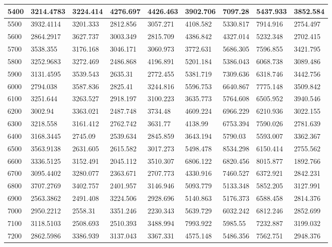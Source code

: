 \begin{table}[]
{\begin{tabular}{|l|l|l|l|l|l|l|l|l|}
5400 & 3214.4783 & 3224.414 & 4276.697 & 4426.463 & 3902.706 & 7097.28 & 5437.933 & 3852.584 \\ \hline
5500 & 3932.4114 & 3201.333 & 2812.856 & 3057.271 & 4108.582 & 5330.817 & 7914.916 & 2754.497 \\ \hline
5600 & 2864.2917 & 3627.737 & 3003.349 & 2815.709 & 4386.842 & 4327.014 & 5232.348 & 2702.415 \\ \hline
5700 & 3538.355 & 3176.168 & 3046.171 & 3060.973 & 3772.631 & 5686.305 & 7596.855 & 3421.795 \\ \hline
5800 & 3252.9683 & 3272.469 & 2486.868 & 4196.891 & 5201.184 & 5386.043 & 6068.738 & 3089.486 \\ \hline
5900 & 3131.4595 & 3539.543 & 2635.31 & 2772.455 & 5381.719 & 7309.636 & 6318.746 & 3442.756 \\ \hline
6000 & 2794.038 & 3587.836 & 2825.41 & 3244.816 & 5596.753 & 6640.867 & 7775.148 & 3509.842 \\ \hline
6100 & 3251.644 & 3263.527 & 2918.197 & 3100.223 & 3635.773 & 5764.608 & 6505.952 & 3940.546 \\ \hline
6200 & 3002.94 & 3363.021 & 2487.748 & 3734.48 & 4609.224 & 6966.229 & 6210.936 & 3022.155 \\ \hline
6300 & 3218.558 & 3161.412 & 2762.742 & 3631.77 & 4138.99 & 6753.394 & 7590.026 & 2781.639 \\ \hline
6400 & 3168.3445 & 2745.09 & 2539.634 & 2845.859 & 3643.194 & 5790.03 & 5593.007 & 3362.367 \\ \hline
6500 & 3563.9138 & 2631.605 & 2615.582 & 3017.273 & 5498.478 & 8534.298 & 6150.414 & 2755.562 \\ \hline
6600 & 3336.5125 & 3152.491 & 2045.112 & 3510.307 & 6806.122 & 6820.456 & 8015.877 & 1892.766 \\ \hline
6700 & 3095.4402 & 3280.077 & 2363.671 & 2707.773 & 4330.916 & 7460.527 & 6372.921 & 2842.231 \\ \hline
6800 & 3707.2769 & 3402.757 & 2401.957 & 3146.946 & 5093.779 & 5133.348 & 5852.205 & 3127.991 \\ \hline
6900 & 2563.3862 & 2491.408 & 3224.506 & 2928.696 & 5140.863 & 5176.373 & 6588.458 & 2814.376 \\ \hline
7000 & 2950.2212 & 2558.31 & 3351.246 & 2230.343 & 5639.729 & 6032.242 & 6812.246 & 2852.699 \\ \hline
7100 & 3118.5103 & 2508.693 & 2510.393 & 3488.994 & 7993.922 & 5985.55 & 7232.887 & 3199.032 \\ \hline
7200 & 2862.5986 & 3386.939 & 3137.043 & 3367.331 & 4575.148 & 5486.356 & 7562.751 & 2948.376 \\ \hline

\end{tabular}}
\end{table}
